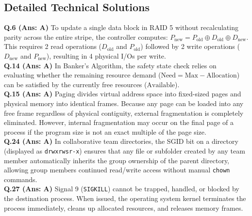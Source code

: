 \vspace{3mm}
\subsection*{Detailed Technical Solutions}

\begin{solutionbox}
\textbf{Q.6 (Ans: A)} To update a single data block in RAID 5 without recalculating parity across the entire stripe, the controller computes: $P_{\text{new}} = P_{\text{old}} \oplus D_{\text{old}} \oplus D_{\text{new}}$. This requires 2 read operations ($D_{\text{old}}$ and $P_{\text{old}}$) followed by 2 write operations ($D_{\text{new}}$ and $P_{\text{new}}$), resulting in 4 physical I/Os per write.\\[2mm]
\textbf{Q.14 (Ans: A)} In Banker's Algorithm, the safety state check relies on evaluating whether the remaining resource demand ($\text{Need} = \text{Max} - \text{Allocation}$) can be satisfied by the currently free resources ($\text{Available}$).\\[2mm]
\textbf{Q.15 (Ans: A)} Paging divides virtual address space into fixed-sized pages and physical memory into identical frames. Because any page can be loaded into any free frame regardless of physical contiguity, external fragmentation is completely eliminated. However, internal fragmentation may occur on the final page of a process if the program size is not an exact multiple of the page size.\\[2mm]
\textbf{Q.24 (Ans: A)} In collaborative team directories, the SGID bit on a directory (displayed as \texttt{drwxrwsr-x}) ensures that any file or subfolder created by any team member automatically inherits the group ownership of the parent directory, allowing group members continued read/write access without manual \texttt{chown} commands.\\[2mm]
\textbf{Q.27 (Ans: A)} Signal 9 (\texttt{SIGKILL}) cannot be trapped, handled, or blocked by the destination process. When issued, the operating system kernel terminates the process immediately, cleans up allocated resources, and releases memory frames.
\end{solutionbox}

\newpage
